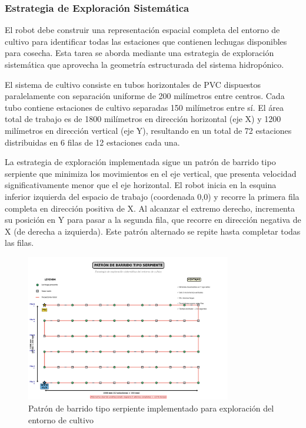 \subsubsection{Estrategia de Exploración Sistemática}

El robot debe construir una representación espacial completa del entorno de cultivo para identificar todas las estaciones que contienen lechugas disponibles para cosecha. Esta tarea se aborda mediante una estrategia de exploración sistemática que aprovecha la geometría estructurada del sistema hidropónico.

El sistema de cultivo consiste en tubos horizontales de PVC dispuestos paralelamente con separación uniforme de 200 milímetros entre centros. Cada tubo contiene estaciones de cultivo separadas 150 milímetros entre sí. El área total de trabajo es de 1800 milímetros en dirección horizontal (eje X) y 1200 milímetros en dirección vertical (eje Y), resultando en un total de 72 estaciones distribuidas en 6 filas de 12 estaciones cada una.

La estrategia de exploración implementada sigue un patrón de barrido tipo serpiente que minimiza los movimientos en el eje vertical, que presenta velocidad significativamente menor que el eje horizontal. El robot inicia en la esquina inferior izquierda del espacio de trabajo (coordenada 0,0) y recorre la primera fila completa en dirección positiva de X. Al alcanzar el extremo derecho, incrementa su posición en Y para pasar a la segunda fila, que recorre en dirección negativa de X (de derecha a izquierda). Este patrón alternado se repite hasta completar todas las filas.

\begin{figure}[h]
\centering
\includegraphics[width=0.8\textwidth]{imagenes/patron_barrido_serpiente.png}
\caption{Patrón de barrido tipo serpiente implementado para exploración del entorno de cultivo}
\label{fig:patron_barrido}
\end{figure}

